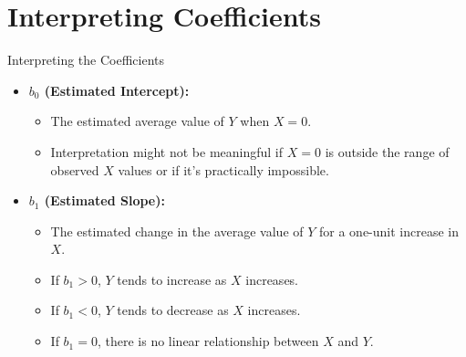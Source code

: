 \documentclass[aspectratio=169]{beamer}
\begin{document}
\section{Interpreting Coefficients}
\begin{frame}{Interpreting the Coefficients}
  \begin{itemize}
    \item \textbf{$b_0$ (Estimated Intercept):}
    \begin{itemize}
        \item The estimated average value of $Y$ when $X=0$.
        \item Interpretation might not be meaningful if $X=0$ is outside the range of observed $X$ values or if it's practically impossible.
    \end{itemize}
    \vspace{1em}
    \item \textbf{$b_1$ (Estimated Slope):}
    \begin{itemize}
        \item The estimated change in the average value of $Y$ for a one-unit increase in $X$.
        \item If $b_1 > 0$, $Y$ tends to increase as $X$ increases.
        \item If $b_1 < 0$, $Y$ tends to decrease as $X$ increases.
        \item If $b_1 = 0$, there is no linear relationship between $X$ and $Y$.
    \end{itemize}
  \end{itemize}
\end{frame}
\end{document}
